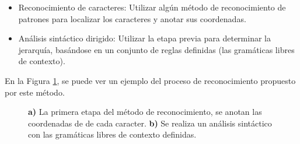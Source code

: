 \begin{itemize}
	\item Reconocimiento de caracteres: Utilizar algún método de reconocimiento de patrones para localizar los caracteres y anotar sus coordenadas. 
	\item Análisis sintáctico dirigido: Utilizar la etapa previa para determinar la jerarquía, basándose en un conjunto de reglas definidas (las gramáticas libres de contexto).
\end{itemize}

En la Figura \ref{fig:gramaticas}, se puede ver un ejemplo del proceso de reconocimiento propuesto por este método.

\begin{figure}[h]
	\centering
	\caption{\textbf{a)} La primera etapa del método de reconocimiento, se anotan las coordenadas de de cada caracter. \textbf{b)} Se realiza un análisis sintáctico con las gramáticas libres de contexto definidas.}
	\label{fig:gramaticas}
\end{figure}

